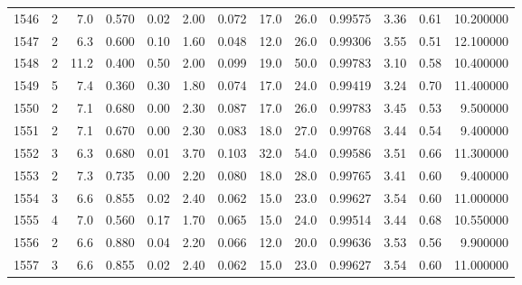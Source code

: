 \begin{tabular}{lrrrrrrrrrrrr}
1546 &        2 &            7.0 &             0.570 &         0.02 &            2.00 &      0.072 &                 17.0 &                  26.0 &  0.99575 &  3.36 &       0.61 &  10.200000 \\
1547 &        2 &            6.3 &             0.600 &         0.10 &            1.60 &      0.048 &                 12.0 &                  26.0 &  0.99306 &  3.55 &       0.51 &  12.100000 \\
1548 &        2 &           11.2 &             0.400 &         0.50 &            2.00 &      0.099 &                 19.0 &                  50.0 &  0.99783 &  3.10 &       0.58 &  10.400000 \\
1549 &        5 &            7.4 &             0.360 &         0.30 &            1.80 &      0.074 &                 17.0 &                  24.0 &  0.99419 &  3.24 &       0.70 &  11.400000 \\
1550 &        2 &            7.1 &             0.680 &         0.00 &            2.30 &      0.087 &                 17.0 &                  26.0 &  0.99783 &  3.45 &       0.53 &   9.500000 \\
1551 &        2 &            7.1 &             0.670 &         0.00 &            2.30 &      0.083 &                 18.0 &                  27.0 &  0.99768 &  3.44 &       0.54 &   9.400000 \\
1552 &        3 &            6.3 &             0.680 &         0.01 &            3.70 &      0.103 &                 32.0 &                  54.0 &  0.99586 &  3.51 &       0.66 &  11.300000 \\
1553 &        2 &            7.3 &             0.735 &         0.00 &            2.20 &      0.080 &                 18.0 &                  28.0 &  0.99765 &  3.41 &       0.60 &   9.400000 \\
1554 &        3 &            6.6 &             0.855 &         0.02 &            2.40 &      0.062 &                 15.0 &                  23.0 &  0.99627 &  3.54 &       0.60 &  11.000000 \\
1555 &        4 &            7.0 &             0.560 &         0.17 &            1.70 &      0.065 &                 15.0 &                  24.0 &  0.99514 &  3.44 &       0.68 &  10.550000 \\
1556 &        2 &            6.6 &             0.880 &         0.04 &            2.20 &      0.066 &                 12.0 &                  20.0 &  0.99636 &  3.53 &       0.56 &   9.900000 \\
1557 &        3 &            6.6 &             0.855 &         0.02 &            2.40 &      0.062 &                 15.0 &                  23.0 &  0.99627 &  3.54 &       0.60 &  11.000000 \\

\end{tabular}
